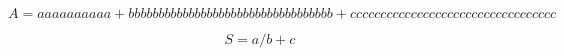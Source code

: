 \[
  A = aaaaaaaaaa + bbbbbbbbbbbbbbbbbbbbbbbbbbbbbbbbbb + cccccccccccccccccccccccccccccccccc
\]

\[
  S = a / b + c
\]
